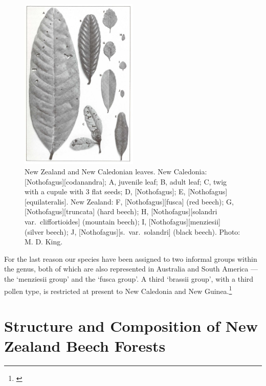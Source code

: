 \begin{figure}
	\includegraphics[width=0.5\textwidth]{graphics/figure70nothofagus.jpg}
	\centering
	\caption[New Zealand and New Caledonian Nothofagus leaves]{New Zealand and New Caledonian  leaves.
New Caledonia: [Nothofagus][codanandra]; A, juvenile leaf; B, adult leaf; C, twig with a cupule with 3 flat seeds; D, [Nothofagus]; E, [Nothofagus][equilateralis].
New Zealand: F, [Nothofagus][fusca] (red beech); G, [Nothofagus][truncata] (hard beech); H, [Nothofagus][solandri var.\ cliffortioides] (mountain beech); I, [Nothofagus][menziesii] (silver beech); J, [Nothofagus][s.\ var.\ solandri] (black beech).
	Photo: M. D. King.}%
	\label{fig:70nothofagus}
\end{figure}

For the last reason our species have been assigned to two informal groups within the genus, both of which are also represented in Australia and South America --- the `menziesii group' and the `fusca group'.
A third `brassii group', with a third pollen type, is restricted at present to New Caledonia and New Guinea.\footnote{\cite{cranwell1939southern}}

\section{Structure and Composition of New Zealand Beech Forests}

